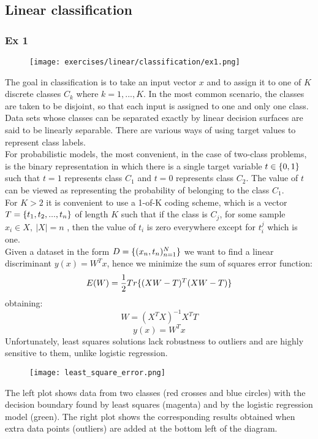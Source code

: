 \subsection{Linear classification}


\subsubsection{Ex 1}


\begin{figure}[H]
    \centering
    \texttt{[image: exercises/linear/classification/ex1.png]}
\end{figure}

The goal in classification is to take an input vector $x$ and to assign it to one of $K$  discrete classes $C_k$ where $k=1,...,K$. In the most common scenario, the classes are taken to be disjoint, so that each input is assigned to one and only one class. Data sets whose classes can be separated exactly by linear decision surfaces are said to be linearly separable. There are various ways of using target values to represent class labels.\\
For probabilistic models, the most convenient, in the case of two-class problems, is the binary representation in which there is a single target variable $t \in \lbrace{0,1}\rbrace$ such that $t=1$ represents class $C_1$  and $t=0$  represents class $C_2$. The value of $t$ can be viewed as representing the probability of belonging to the class $C_1$.\\
For $K>2$  it is convenient to use a 1-of-K coding scheme, which is a vector $T=\lbrace{t_1,t_2,...,t_n}\rbrace$ of length $K$ such that if the class is $C_j$, for some sample $x_i \in X,\ |X|=n$ , then the value of $t_i$ is zero everywhere except for $t_i^j$ which is one. \\
Given a dataset in the form $D=\lbrace{(x_n,t_n)^N_{n=1}}\rbrace$ we want to find a linear discriminant $y(x)=W^Tx$, hence we minimize the sum of squares error function:
\[E(W)=\frac{1}{2}Tr\lbrace{(XW-T)^T(XW-T)}\rbrace\]
obtaining:
\[W=(X^TX)^{-1}X^TT\]
\[y(x)=W^Tx\]
Unfortunately, least squares solutions lack robustness to outliers and are highly sensitive to them, unlike logistic regression.

\begin{figure}[H]
    \centering
    \texttt{[image: least\_square\_error.png]}
\end{figure}
The left plot shows data from two classes (red crosses and blue circles) with the decision boundary found by least squares (magenta) and by the logistic regression model (green). The right plot shows the corresponding results obtained when extra data points (outliers) are added at the bottom left of the diagram.

